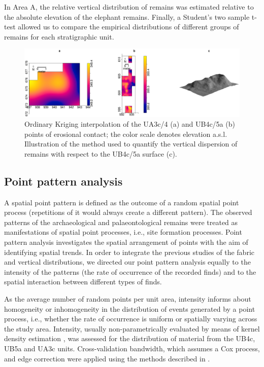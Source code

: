 \documentclass[preprint,authoryear,times]{elsarticle} %
\begin{document}
In Area A, %
the relative vertical distribution of remains was estimated relative to the absolute elevation of the elephant remains. Finally, a Student's two sample t-test allowed us to compare the empirical distributions of different groups of remains for each stratigraphic unit.

\begin{figure}[]
  \centering
  \includegraphics[width=1\textwidth]{../artwork/Fig5.eps}
  \caption{Ordinary Kriging interpolation of the UA3c/4 (a) and UB4c/5a (b) points of erosional contact; the color scale denotes elevation a.s.l. Illustration of the method used to quantify the vertical dispersion of remains with respect to the UB4c/5a surface (c).}
  \label{fig:5}
\end{figure}

\subsection{Point pattern analysis}

A spatial point pattern is defined as the outcome of a random spatial point process (repetitions of it would always create a different pattern). The observed patterns of the archaeological and palaeontological remains were treated as manifestations of spatial point processes, i.e., site formation processes. Point pattern analysis investigates the spatial arrangement of points with the aim of identifying spatial trends. In order to integrate the previous studies of the fabric and vertical distributions, we directed our point pattern analysis equally to the intensity of the patterns (the rate of occurrence of the recorded finds) and to the spatial interaction between different types of finds.

As the average number of random points per unit area, intensity informs about homogeneity or inhomogeneity in the distribution of events generated by a point process, i.e., whether the rate of occurrence is uniform or spatially varying across the study area. Intensity, usually non-parametrically evaluated by means of kernel density estimation \citep{Diggle1985}, was assessed for the distribution of material from the UB4c, UB5a and UA3c units. Cross-validation bandwidth, which assumes a Cox process, and edge correction were applied using the methods described in \cite{Diggle1985}.
\end{document}
